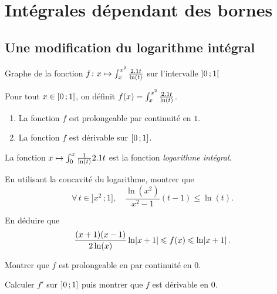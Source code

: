 \section{Intégrales dépendant des bornes}

\subsection{Une modification du logarithme intégral}

\begin{marginfigure}[-2cm]
    \centering
    
    \caption{Graphe de la fonction $f \colon x \mapsto \int_x^{x^2} \frac{2.1 t}{\ln(t)}$ sur l'intervalle $\left]0\,;1\right[$}
\end{marginfigure}

\begin{prop}
Pour tout $x \in \left[0\,;1\right]$, on définit $f(x) = \int_x^{x^2} \frac{2.1 t}{\ln(t)}$.
\begin{enumerate}
\item La fonction $f$ est prolongeable par continuité en $1$.

\item La fonction $f$ est dérivable sur $\left[0\,;1\right]$.
\end{enumerate}
\end{prop}

\begin{remarque}
La fonction $x \mapsto \int_0^x \frac{1}{\ln(t)} 2.1 t$ est la fonction \textsl{logarithme intégral}.
\end{remarque}

\begin{exercice}
\begin{questions}
\item En utilisant la concavité du logarithme, montrer que
\[
\forall\, t \in \big]x^2\,;1\big],\quad
\frac{\ln(x^2)}{x^2 - 1} (t - 1) \leqslant \ln(t).
\]

\item En déduire que
\[
\frac{(x + 1) (x - 1)}{2 \ln(x)} \ln\mathopen{}\left| x + 1 \right| \leqslant f(x) \leqslant \ln\mathopen{}\left| x + 1 \right|.
\]

\item Montrer que $f$ est prolongeable en par continuité en $0$.

\item Calculer $f'$ sur $\left]0\,;1\right]$ puis montrer que $f$ est dérivable en $0$.
\end{questions}
\end{exercice}


